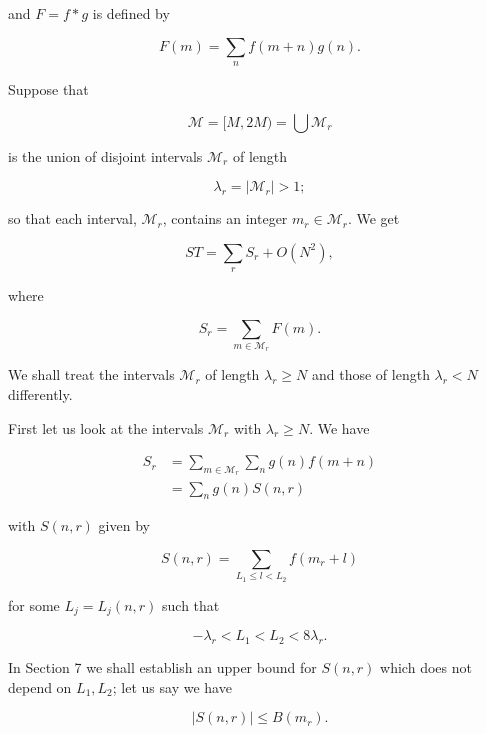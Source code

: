 \documentclass[10pt]{article}
\begin{document}
and $F=f * g$ is defined by

$$
F(m)=\sum_{n} f(m+n) g(n) .
$$

Suppose that

$$
\mathscr{M}=[M, 2 M)=\bigcup \mathscr{M}_{r}
$$

is the union of disjoint intervals $\mathscr{M}_{r}$ of length

$$
\lambda_{r}=\left|\mathscr{M}_{r}\right|>1 ;
$$

so that each interval, $\mathscr{M}_{r}$, contains an integer $m_{r} \in \mathscr{M}_{r}$. We get


\begin{equation*}
S T=\sum_{r} S_{r}+O\left(N^{2}\right), \tag{5.1}
\end{equation*}


where


\begin{equation*}
S_{r}=\sum_{m \in \mathscr{M}_{r}} F(m) . \tag{5.2}
\end{equation*}


We shall treat the intervals $\mathscr{M}_{r}$ of length $\lambda_{r} \geqslant N$ and those of length $\lambda_{r}<N$ differently.

First let us look at the intervals $\mathscr{M}_{r}$ with $\lambda_{r} \geqslant N$. We have


\begin{align*}
S_{r} & =\sum_{m \in \mathscr{M}_{r}} \sum_{n} g(n) f(m+n)  \tag{5.3}\\
& =\sum_{n} g(n) S(n, r)
\end{align*}


with $S(n, r)$ given by


\begin{equation*}
S(n, r)=\sum_{L_{1} \leqslant l<L_{2}} f\left(m_{r}+l\right) \tag{5.4}
\end{equation*}


for some $L_{j}=L_{j}(n, r)$ such that


\begin{equation*}
-\lambda_{r}<L_{1}<L_{2}<8 \lambda_{r} . \tag{5.5}
\end{equation*}


In Section 7 we shall establish an upper bound for $S(n, r)$ which does not depend on $L_{1}, L_{2}$; let us say we have


\begin{equation*}
|S(n, r)| \leqslant B\left(m_{r}\right) . \tag{5.6}
\end{equation*}
\end{document}
